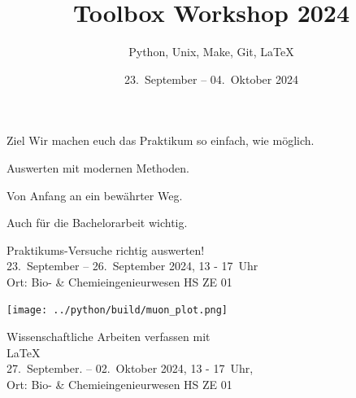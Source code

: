 

\title[Toolbox 2024]{Toolbox Workshop 2024}
\subtitle{Python, Unix, Make, Git, \LaTeX{}}
\date{23.~September – 04.~Oktober 2024}
\author[Toolbox Workshop Team]{}



\maketitle

\begin{frame}{Ziel}
  \setlength\parskip{3ex}
  \huge
  Wir machen euch das Praktikum so einfach, wie möglich.

  Auswerten mit modernen Methoden.

  Von Anfang an ein bewährter Weg.

  Auch für die Bachelorarbeit wichtig.
\end{frame}

\begin{frame}
  \vspace{0.7cm}
  \begin{center}
    \huge Praktikums-Versuche richtig auswerten!\\
    23.~September – 26.~September 2024, 13 - 17~Uhr\\%
    Ort: Bio- \& Chemieingenieurwesen HS ZE 01
  \end{center}
\end{frame}

\begin{frame}[plain]
  \centering
  \texttt{[image: ../python/build/muon\_plot.png]}
\end{frame}

\begin{frame}
  \begin{center}
    \huge Wissenschaftliche Arbeiten verfassen mit \\[0.5\baselineskip]
    \textrm{\fontsize{80}{120}\selectfont\LaTeX{}}\\[0.5\baselineskip]
    27.~September. – 02.~Oktober 2024, 13 - 17~Uhr,\\
    Ort: Bio- \& Chemieingenieurwesen HS ZE 01
  \end{center}
\end{frame}

